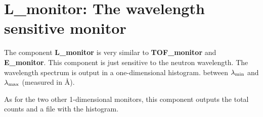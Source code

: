 

\section{L\_monitor: The wavelength sensitive monitor}
\label{s:L_monitor}



The component {\bf L\_monitor} is very similar to
{\bf TOF\_monitor} and {\bf E\_monitor}.
This component is just sensitive to the neutron wavelength.
The wavelength spectrum is output in a one-dimensional histogram.
between $\lambda_{\rm min}$ and $\lambda_{\rm max}$ (measured in \AA ).

As for the two other 1-dimensional monitors, this component outputs
the total counts and a file with the histogram.

